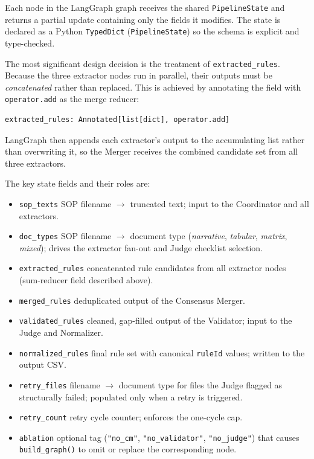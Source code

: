 ﻿\documentclass[11pt]{article}
\begin{document}
Each node in the LangGraph graph receives the shared \texttt{PipelineState} and
returns a partial update containing only the fields it modifies.  The state is
declared as a Python \texttt{TypedDict} (\texttt{PipelineState}) so the schema
is explicit and type-checked.

The most significant design decision is the treatment of \texttt{extracted\_rules}.
Because the three extractor nodes run in parallel, their outputs must be
\emph{concatenated} rather than replaced.  This is achieved by annotating the
field with \texttt{operator.add} as the merge reducer:

\begin{verbatim}
extracted_rules: Annotated[list[dict], operator.add]
\end{verbatim}

LangGraph then appends each extractor's output to the accumulating list rather
than overwriting it, so the Merger receives the combined candidate set from all
three extractors.

The key state fields and their roles are:

\begin{itemize}
    \item \texttt{sop\_texts} SOP filename $\to$ truncated text; input to the
          Coordinator and all extractors.
    \item \texttt{doc\_types} SOP filename $\to$ document type (\textit{narrative},
          \textit{tabular}, \textit{matrix}, \textit{mixed}); drives the extractor
          fan-out and Judge checklist selection.
    \item \texttt{extracted\_rules} concatenated rule candidates from all extractor
          nodes (sum-reducer field described above).
    \item \texttt{merged\_rules} deduplicated output of the Consensus Merger.
    \item \texttt{validated\_rules} cleaned, gap-filled output of the Validator;
          input to the Judge and Normalizer.
    \item \texttt{normalized\_rules} final rule set with canonical \texttt{ruleId}
          values; written to the output CSV.
    \item \texttt{retry\_files} filename $\to$ document type for files the Judge
          flagged as structurally failed; populated only when a retry is triggered.
    \item \texttt{retry\_count} retry cycle counter; enforces the one-cycle cap.
    \item \texttt{ablation} optional tag (\texttt{"no\_cm"}, \texttt{"no\_validator"},
          \texttt{"no\_judge"}) that causes \texttt{build\_graph()} to omit or replace
          the corresponding node.
\end{itemize}
\end{document}
